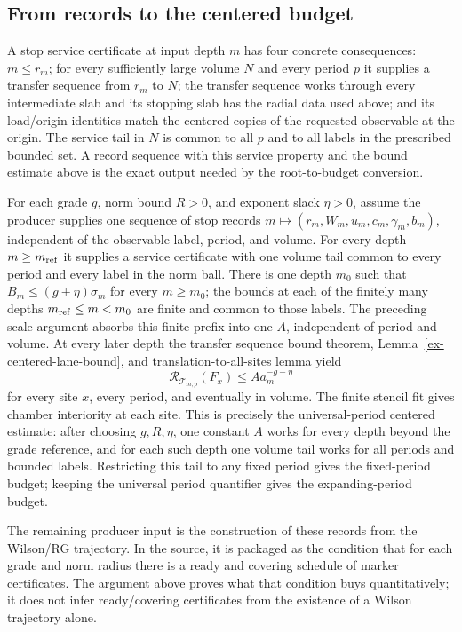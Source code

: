\subsection{From records to the centered budget}

A stop service certificate at input depth $m$ has four concrete consequences: $m\leq r_m$; for every sufficiently large volume $N$ and every period $p$ it supplies a transfer sequence from $r_m$ to $N$; the transfer sequence works through every intermediate slab and its stopping slab has the radial data used above; and its load/origin identities match the centered copies of the requested observable at the origin. The service tail in $N$ is common to all $p$ and to all labels in the prescribed bounded set. A record sequence with this service property and the bound estimate above is the exact output needed by the root-to-budget conversion.

For each grade $g$, norm bound $R>0$, and exponent slack $\eta>0$, assume the producer supplies one sequence of stop records $m\mapsto(r_m,W_m,u_m,c_m,\gamma_m,b_m)$, independent of the observable label, period, and volume. For every depth $m\geq m_{\rm ref}$ it supplies a service certificate with one volume tail common to every period and every label in the norm ball. There is one depth $m_0$ such that $B_m\leq(g+\eta)\sigma_m$ for every $m\geq m_0$; the bounds at each of the finitely many depths $m_{\rm ref}\leq m<m_0$ are finite and common to those labels. The preceding scale argument absorbs this finite prefix into one $A$, independent of period and volume. At every later depth the transfer sequence bound theorem, Lemma~\ref{ex-centered-lane-bound}, and translation-to-all-sites lemma yield
\[
 \mathcal R_{\mathcal T_{m,p}}(F_x)\leq A a_m^{-g-\eta}
\]
for every site $x$, every period, and eventually in volume. The finite stencil fit gives chamber interiority at each site. This is precisely the universal-period centered estimate: after choosing $g,R,\eta$, one constant $A$ works for every depth beyond the grade reference, and for each such depth one volume tail works for all periods and bounded labels. Restricting this tail to any fixed period gives the fixed-period budget; keeping the universal period quantifier gives the expanding-period budget.

The remaining producer input is the construction of these records from the Wilson/RG trajectory. In the source, it is packaged as the condition that for each grade and norm radius there is a ready and covering schedule of marker certificates. The argument above proves what that condition buys quantitatively; it does not infer ready/covering certificates from the existence of a Wilson trajectory alone.

